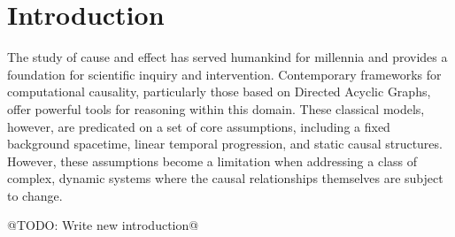 \section{Introduction}
\label{sec:introduction}

The study of cause and effect has served humankind for millennia and provides a foundation for scientific inquiry and intervention. 
Contemporary frameworks for computational causality, particularly those based on Directed Acyclic Graphs, offer powerful tools for reasoning within this domain. These classical models, however, are predicated on a set of core assumptions, including a fixed background spacetime, linear temporal progression, and static causal structures.  However, these assumptions become a limitation when addressing a class of complex, dynamic systems where the causal relationships themselves are subject to change.


@TODO: Write new introduction@

\newpage
